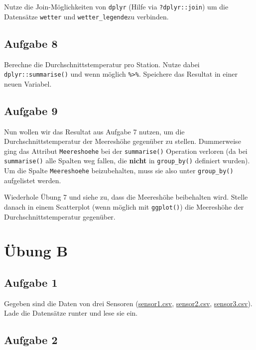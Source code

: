 \documentclass[]{book}
\begin{document}
Nutze die Join-Möglichkeiten von \texttt{dplyr} (Hilfe via \texttt{?dplyr::join}) um die Datensätze \texttt{wetter} und \texttt{wetter\_legende}zu verbinden.

\hypertarget{aufgabe-8-1}{%
\subsection{Aufgabe 8}\label{aufgabe-8-1}}

Berechne die Durchschnittstemperatur pro Station. Nutze dabei \texttt{dplyr::summarise()} und wenn möglich \texttt{\%\textgreater{}\%}. Speichere das Resultat in einer neuen Variabel.

\hypertarget{aufgabe-9}{%
\subsection{Aufgabe 9}\label{aufgabe-9}}

Nun wollen wir das Resultat aus Aufgabe 7 nutzen, um die Durchschnittstemperatur der Meereshöhe gegenüber zu stellen. Dummerweise ging das Attribut \texttt{Meereshoehe} bei der \texttt{summarise()} Operation verloren (da bei \texttt{summarise()} alle Spalten weg fallen, die \textbf{nicht} in \texttt{group\_by()} definiert wurden). Um die Spalte \texttt{Meereshoehe} beizubehalten, muss sie also unter \texttt{group\_by()} aufgelistet werden.

Wiederhole Übung 7 und siehe zu, dass die Meereshöhe beibehalten wird. Stelle danach in einem Scatterplot (wenn möglich mit \texttt{ggplot()}) die Meereshöhe der Durchschnittstemperatur gegenüber.

\hypertarget{ubung-b-1}{%
\section{Übung B}\label{ubung-b-1}}

\hypertarget{aufgabe-1-3}{%
\subsection{Aufgabe 1}\label{aufgabe-1-3}}

Gegeben sind die Daten von drei Sensoren (\href{10_PrePro2/data/sensor1.csv}{sensor1.csv}, \href{10_PrePro2/data/sensor2.csv}{sensor2.csv}, \href{10_PrePro2/data/sensor3.csv}{sensor3.csv}). Lade die Datensätze runter und lese sie ein.

\hypertarget{aufgabe-2-3}{%
\subsection{Aufgabe 2}\label{aufgabe-2-3}}
\end{document}
